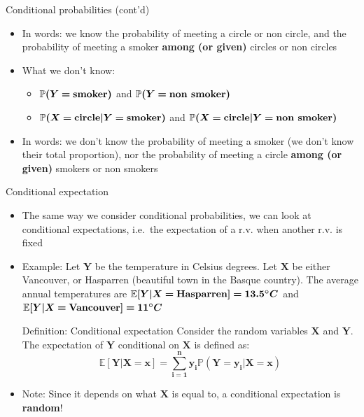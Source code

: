\documentclass[
  ignorenonframetext,
  aspectratio=169]{beamer}
\providecommand{\tightlist}{%
  \setlength{\itemsep}{0pt}\setlength{\parskip}{0pt}}
\begin{document}
\begin{frame}{Conditional probabilities (cont'd)}
\protect\hypertarget{conditional-probabilities-contd}{}
\begin{itemize}
\tightlist
\item
  In words: we know the probability of meeting a circle or non circle,
  and the probability of meeting a smoker \textbf{among (or given)}
  circles or non circles
\item
  What we don't know:

  \begin{itemize}
  \tightlist
  \item
    \(\bm{\mathbb{P}(Y=} \textrm{\textbf{smoker}} \bm{)}\) and
    \(\bm{\mathbb{P}(Y=} \textrm{\textbf{non smoker}} \bm{)}\)
  \item
    \(\bm{\mathbb{P}(X=} \textrm{\textbf{circle}} \bm{|Y=} \textrm{\textbf{smoker}} \bm{)}\)
    and
    \(\bm{\mathbb{P}(X=} \textrm{\textbf{circle}} \bm{|Y=} \textrm{\textbf{non smoker}} \bm{)}\)
  \end{itemize}
\item
  In words: we don't know the probability of meeting a smoker (we don't
  know their total proportion), nor the probability of meeting a circle
  \textbf{among (or given)} smokers or non smokers
\end{itemize}
\end{frame}

\begin{frame}{Conditional expectation}
\protect\hypertarget{conditional-expectation}{}
\label{cond exp}

\begin{itemize}
\tightlist
\item
  The same way we consider conditional probabilities, we can look at
  conditional expectations, i.e.~the expectation of a r.v. when another
  r.v. is fixed
\item
  Example: Let \(\bm{Y}\) be the temperature in Celsius degrees. Let
  \(\bm{X}\) be either Vancouver, or Hasparren (beautiful town in the
  Basque country). The average annual temperatures are
  \(\bm{\mathbb{E}[Y|X=}\textrm{\textbf{Hasparren}}\bm{ ]=13.5^\circ C}\)
  and
  \(\bm{\mathbb{E}[Y|X=}\textrm{\textbf{Vancouver}}\bm{ ]=11^\circ C}\)

  \begin{block}{Definition: Conditional expectation}
  Consider the random variables $\bm{X}$ and $\bm{Y}$. The expectation of $\bm{Y}$ conditional on $\bm{X}$ is defined as:
  $$
  \bm{\mathbb{E}[Y|X=x] = \sum_{i = 1}^{n}y_i\mathbb{P}(Y = y_i|X=x)}
  $$
  \end{block}
\item
  Note: Since it depends on what \(\bm{X}\) is equal to, a conditional
  expectation is \textbf{random}!
\end{itemize}
\end{frame}
\end{document}
